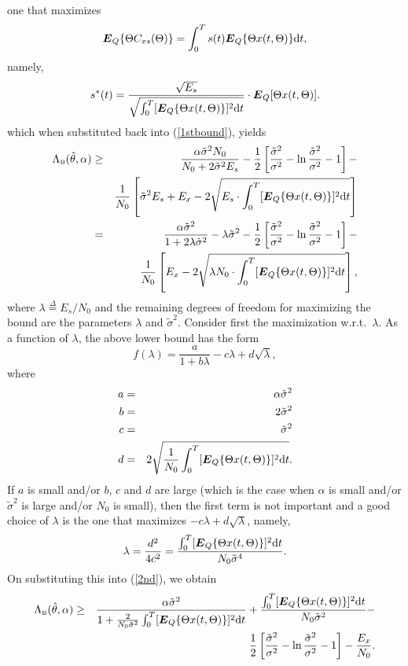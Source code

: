 \documentclass[11pt,epsf]{article}
\newcommand {\dfn} {\stackrel{\Delta} {=}}
\newcommand{\tsig}{\tilde{\sigma}}
\newcommand{\ct}{\hat{\theta}}
\newcommand {\bE} {\mbox{\boldmath $E$}}
\begin{document}
one that maximizes 
\begin{equation}
\bE_Q\{\Theta C_{xs}(\Theta)\}=\int_0^Ts(t)\bE_Q\{\Theta x(t,\Theta)\}\mbox{d}t,
\end{equation}
namely,
\begin{equation}
s^*(t)=\frac{\sqrt{E_s}}{\sqrt{\int_0^T[\bE_Q\{\Theta
x(t,\Theta)\}]^2\mbox{d}t}}\cdot\bE_Q[\Theta x(t,\Theta)].
\end{equation}
which when substituted back into (\ref{1stbound}), yields
\begin{eqnarray}
\label{2nd}
\Lambda_{\mbox{\tiny B}}(\ct,\alpha)&\ge&
\frac{\alpha\tsig^2N_0}{N_0+2\tsig^2E_s}-\frac{1}{2}\left[\frac{\tsig^2}{\sigma^2}-
\ln\frac{\tsig^2}{\sigma^2}-1\right]-\nonumber\\
& &\frac{1}{N_0}\left[\tsig^2E_s+E_x-2\sqrt{E_s\cdot\int_0^T[\bE_Q\{\Theta
x(t,\Theta)\}]^2\mbox{d}t}\right]\\
&=&\frac{\alpha\tsig^2}{1+2\lambda\tsig^2}-\lambda\tsig^2-
\frac{1}{2}\left[\frac{\tsig^2}{\sigma^2}-
\ln\frac{\tsig^2}{\sigma^2}-1\right]-\nonumber\\
& &\frac{1}{N_0}\left[E_x-2\sqrt{\lambda N_0\cdot\int_0^T[\bE_Q\{\Theta
x(t,\Theta)\}]^2\mbox{d}t}\right],
\end{eqnarray}
where $\lambda\dfn E_s/N_0$
and the remaining degrees of freedom for maximizing the bound are the
parameters $\lambda$ and $\tsig^2$. Consider first the maximization w.r.t.\
$\lambda$. As a function of $\lambda$, the above lower bound has the form
$$f(\lambda)=\frac{a}{1+b\lambda}-c\lambda+d\sqrt{\lambda},$$
where
\begin{eqnarray}
a&=&\alpha\tsig^2\\
b&=&2\tsig^2\\
c&=&\tsig^2\\
d&=&2\sqrt{\frac{1}{N_0}\int_0^T[\bE_Q\{\Theta x(t,\Theta)\}]^2\mbox{d}t}.
\end{eqnarray}
If $a$ is small and/or $b$, $c$ and $d$ are large (which is the case when $\alpha$
is small and/or $\tsig^2$ is large and/or $N_0$ is small), then the first term
is not important and a good choice of $\lambda$ is the one that maximizes
$-c\lambda+d\sqrt{\lambda}$, namely,
$$\lambda=\frac{d^2}{4c^2}=\frac{\int_0^T[\bE_Q\{\Theta
x(t,\Theta)\}]^2\mbox{d}t}{N_0\tsig^4}.$$
On substituting this into (\ref{2nd}), we obtain
\begin{eqnarray}
\Lambda_{\mbox{\tiny B}}(\ct,\alpha)
&\ge&
\frac{\alpha\tsig^2}{1+\frac{2}{N_0\tsig^2}
\int_0^T[\bE_Q\{\Theta x(t,\Theta)\}]^2\mbox{d}t}
+\frac{\int_0^T[\bE_Q\{\Theta
x(t,\Theta)\}]^2\mbox{d}t}{N_0\tsig^2}-\nonumber\\
& &\frac{1}{2}\left[\frac{\tsig^2}{\sigma^2}-
\ln\frac{\tsig^2}{\sigma^2}-1\right]-\frac{E_x}{N_0}.
\end{eqnarray}
\end{document}
